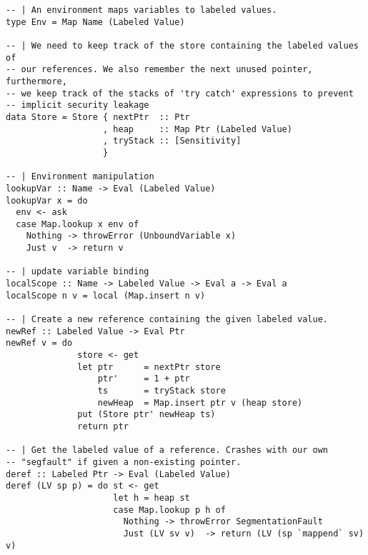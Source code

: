 \documentclass[10pt]{article}
\begin{document}
\begin{lstlisting}
-- | An environment maps variables to labeled values.                                                                                                                                         
type Env = Map Name (Labeled Value)

-- | We need to keep track of the store containing the labeled values of                                                                                                                      
-- our references. We also remember the next unused pointer, furthermore,                                                                                                                     
-- we keep track of the stacks of 'try catch' expressions to prevent                                                                                                                     
-- implicit security leakage                                                                                                                                                                  
data Store = Store { nextPtr  :: Ptr
                   , heap     :: Map Ptr (Labeled Value)
                   , tryStack :: [Sensitivity]
                   }

-- | Environment manipulation                                                                                                                                                                 
lookupVar :: Name -> Eval (Labeled Value)
lookupVar x = do
  env <- ask
  case Map.lookup x env of
    Nothing -> throwError (UnboundVariable x)
    Just v  -> return v
    
-- | update variable binding                                                                                                                                                                  
localScope :: Name -> Labeled Value -> Eval a -> Eval a
localScope n v = local (Map.insert n v)

-- | Create a new reference containing the given labeled value.                                                                                                                               
newRef :: Labeled Value -> Eval Ptr
newRef v = do
              store <- get
              let ptr      = nextPtr store
                  ptr'     = 1 + ptr
                  ts       = tryStack store
                  newHeap  = Map.insert ptr v (heap store)
              put (Store ptr' newHeap ts)
              return ptr
              
-- | Get the labeled value of a reference. Crashes with our own                                                                                                                               
-- "segfault" if given a non-existing pointer.                                                                                                                                                
deref :: Labeled Ptr -> Eval (Labeled Value)
deref (LV sp p) = do st <- get
                     let h = heap st
                     case Map.lookup p h of
                       Nothing -> throwError SegmentationFault
                       Just (LV sv v)  -> return (LV (sp `mappend` sv) v)
                       

\end{lstlisting}
\end{document}
